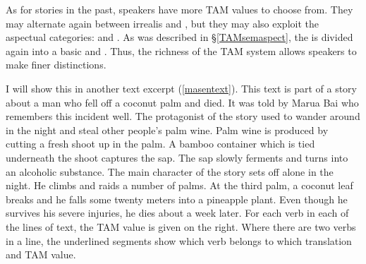 As for stories in the past, speakers have more TAM values to choose from. They may alternate again between irrealis and , but they may also exploit the aspectual categories:  and . As was described in {\S}\ref{TAMsemaspect}, the  is divided again into a basic  and . Thus, the richness of the TAM system allows speakers to make finer distinctions.

I will show this in another text excerpt (\ref{masentext}). This text is part of a story about a man who fell off a coconut palm and died. It was told by Marua Bai who remembers this incident well. The protagonist of the story used to wander around in the night and steal other people's palm wine. Palm wine is produced by cutting a fresh shoot up in the palm. A bamboo container which is tied underneath the shoot captures the sap. The sap slowly ferments and turns into an alcoholic substance. The main character of the story sets off alone in the night. He climbs and raids a number of palms. At the third palm, a coconut leaf breaks and he falls some twenty meters into a pineapple plant. Even though he survives his severe injuries, he dies about a week later. For each verb in each of the lines of text, the TAM value is given on the right. Where there are two verbs in a line, the underlined segments show which verb belongs to which translation and TAM value.

